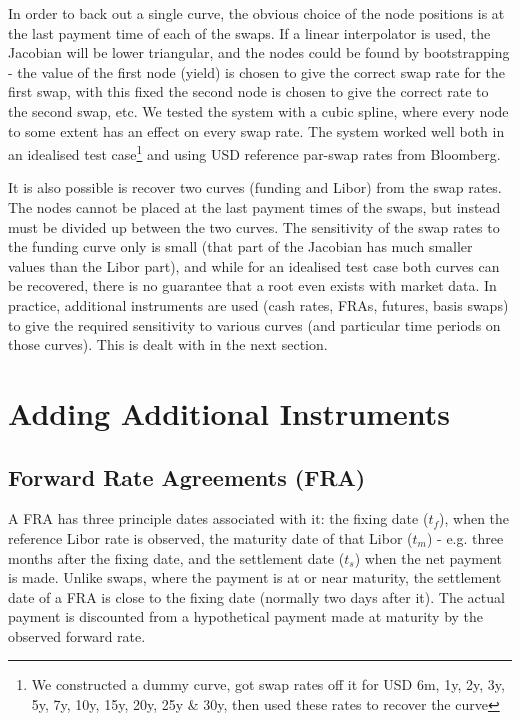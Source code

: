 In order to back out a single curve, the obvious choice of the node positions is at the last payment time of each of the swaps. If a linear interpolator is used, the Jacobian will be lower triangular, and the nodes could be found by bootstrapping - the value of the first node (yield) is chosen to give the correct swap rate for the first swap, with this fixed the second node is chosen to give the correct rate to the second swap, etc. We tested the system with a cubic spline, where every node to some extent has an effect on every swap rate. The system worked well both in an idealised test case\footnote{We constructed a dummy curve, got swap rates off it for USD 6m, 1y, 2y, 3y, 5y, 7y, 10y, 15y, 20y, 25y \& 30y, then used these rates to recover the curve} and using USD reference par-swap rates from Bloomberg.

It is also possible is recover two curves (funding and Libor) from the swap rates. The nodes cannot be placed at the last payment times of the swaps, but instead must be divided up between the two curves. The sensitivity of the swap rates to the funding curve only is small (that part of the Jacobian has much smaller values than the Libor part), and while for an idealised test case both curves can be recovered, there is no guarantee that a root even exists with market data. In practice, additional instruments are used (cash rates, FRAs, futures, basis swaps) to give the required sensitivity to various curves (and particular time periods on those curves). This is dealt with in the next section.



\section{Adding Additional Instruments}

\subsection{Forward Rate Agreements (FRA)}

A FRA has three principle dates associated with it: the fixing date ($t_f$), when the reference Libor rate is observed, the maturity date of that Libor  ($t_m$) - e.g. three months after the fixing date, and the settlement date ($t_s$) when the net payment is made. Unlike swaps, where the payment is at or near maturity, the settlement date of a FRA is close to the fixing date (normally two days after it). 
The actual payment is discounted from a hypothetical payment made at maturity by the observed forward rate.  

